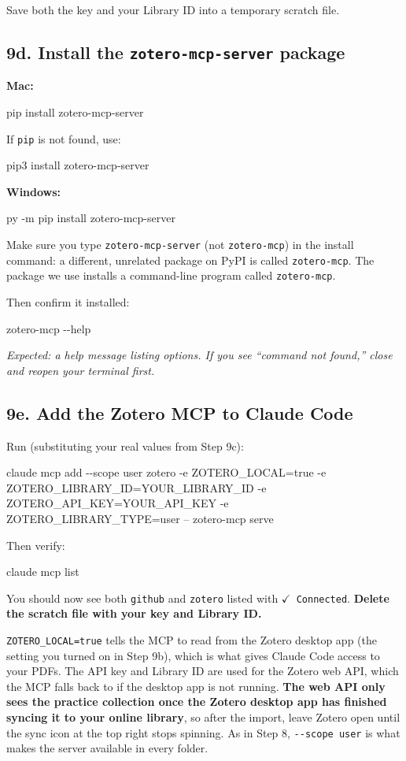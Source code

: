 \documentclass[11pt]{article}
\newcommand{\cmd}[1]{\par\vspace{0.2em}\colorbox{codegray}{\parbox{\dimexpr\linewidth-2\fboxsep}{\ttfamily\small #1}}\par\vspace{0.2em}}
\newcommand{\plat}[1]{{\color{headingblue}\textbf{#1}}}
\begin{document}
Save both the key and your Library ID into a temporary scratch file.

\subsection*{9d. Install the \texttt{zotero-mcp-server} package}

\plat{Mac:}
\cmd{pip install zotero-mcp-server}
If \texttt{pip} is not found, use:
\cmd{pip3 install zotero-mcp-server}

\plat{Windows:}
\cmd{py -m pip install zotero-mcp-server}

Make sure you type \texttt{zotero-mcp-server} (not \texttt{zotero-mcp}) in the install command: a different, unrelated package on PyPI is called \texttt{zotero-mcp}. The package we use installs a command-line program called \texttt{zotero-mcp}.

Then confirm it installed:
\cmd{zotero-mcp -\/-help}

\textit{Expected: a help message listing options. If you see ``command not found,'' close and reopen your terminal first.}

\subsection*{9e. Add the Zotero MCP to Claude Code}

Run (substituting your real values from Step 9c):
\cmd{\footnotesize claude mcp add -\/-scope user zotero -e ZOTERO\_LOCAL=true -e ZOTERO\_LIBRARY\_ID=YOUR\_LIBRARY\_ID -e ZOTERO\_API\_KEY=YOUR\_API\_KEY -e ZOTERO\_LIBRARY\_TYPE=user -- zotero-mcp serve}

Then verify:
\cmd{claude mcp list}

You should now see both \texttt{github} and \texttt{zotero} listed with \texttt{$\checkmark$ Connected}. \textbf{Delete the scratch file with your key and Library ID.}

\texttt{ZOTERO\_LOCAL=true} tells the MCP to read from the Zotero desktop app (the setting you turned on in Step 9b), which is what gives Claude Code access to your PDFs. The API key and Library ID are used for the Zotero web API, which the MCP falls back to if the desktop app is not running. \textbf{The web API only sees the practice collection once the Zotero desktop app has finished syncing it to your online library}, so after the import, leave Zotero open until the sync icon at the top right stops spinning. As in Step 8, \texttt{-\/-scope user} is what makes the server available in every folder.
\end{document}
